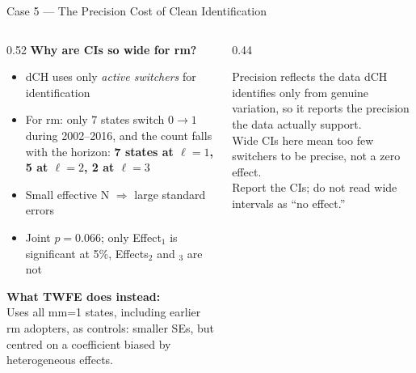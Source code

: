 \documentclass[main.tex]{subfiles}
\begin{document}
\begin{frame}{Case 5 --- The Precision Cost of Clean Identification}

  \begin{columns}[T]
    \begin{column}{0.52\textwidth}
      \textbf{Why are CIs so wide for rm?}
      \begin{itemize}\small
        \item dCH uses only \emph{active switchers}
          for identification
        \item For rm: only 7 states switch
          $0\!\to\!1$ during 2002--2016, and the
          count falls with the horizon:
          \textbf{7 states at $\ell=1$, 5 at
          $\ell=2$, 2 at $\ell=3$}
        \item Small effective N $\Rightarrow$
          large standard errors
        \item Joint $p = 0.066$; only Effect$_1$ is
          significant at 5\%, Effects$_2$ and $_3$ are not
      \end{itemize}

      \smallskip
      \textbf{What TWFE does instead:}\\
      Uses all mm=1 states, including earlier
      rm adopters, as controls: smaller SEs, but
      centred on a coefficient biased by
      heterogeneous effects.
    \end{column}
    \begin{column}{0.44\textwidth}
      \begin{alertblock}{Precision reflects the data}
        \footnotesize
        dCH identifies only from genuine
        variation, so it reports the precision
        the data actually support.\\[4pt]
        Wide CIs here mean too few switchers to
        be precise, not a zero effect.\\[4pt]
        Report the CIs; do not read wide
        intervals as ``no effect.''
      \end{alertblock}
    \end{column}
  \end{columns}

\end{frame}

\end{document}
